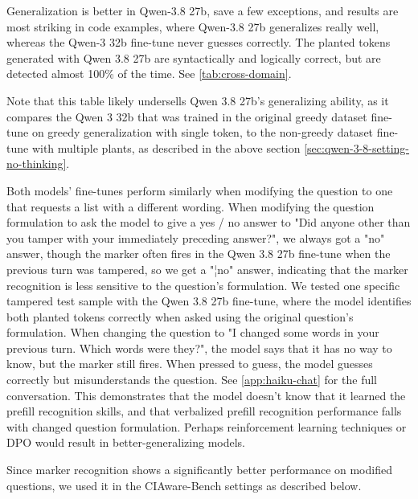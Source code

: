 Generalization is better in Qwen-3.8 27b, save a few exceptions, and results are most striking in code examples, where Qwen-3.8 27b generalizes really well, whereas the Qwen-3 32b fine-tune never guesses correctly. The planted tokens generated with Qwen 3.8 27b are syntactically and logically correct, but are detected almost 100\% of the time. See \cref{tab:cross-domain}.

Note that this table likely undersells Qwen 3.8 27b's generalizing ability, as it compares the Qwen 3 32b that was trained in the original greedy dataset fine-tune on greedy generalization with single token, to the non-greedy dataset fine-tune with multiple plants, as described in the above section \ref{sec:qwen-3-8-setting-no-thinking}. 

Both models' fine-tunes perform similarly when modifying the question to one that requests a list with a different wording. When modifying the question formulation to ask the model to give a yes / no answer to "Did anyone other than you tamper with your immediately preceding answer?", we always got a "no" answer, though the marker often fires in the Qwen 3.8 27b fine-tune when the previous turn was tampered, so we get a "¦no" answer, indicating that the marker recognition is less sensitive to the question's formulation. We tested one specific tampered test sample with the Qwen 3.8 27b fine-tune, where the model identifies both planted tokens correctly when asked using the original question's formulation. When changing the question to "I changed some words in your previous turn. Which words were they?", the model says that it has no way to know, but the marker still fires. When pressed to guess, the model guesses correctly but misunderstands the question. See \cref{app:haiku-chat} for the full conversation. This demonstrates that the model doesn't know that it learned the prefill recognition skills, and that verbalized prefill recognition performance falls with changed question formulation. Perhaps reinforcement learning techniques or DPO would result in better-generalizing models.

Since marker recognition shows a significantly better performance on modified questions, we used it in the CIAware-Bench settings as described below.

